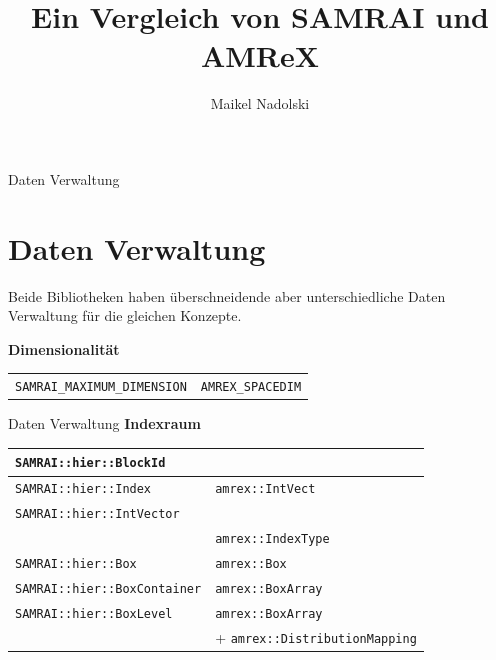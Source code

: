 \documentclass[ucs,9pt]{beamer}
\title[SAMRAI vs. AMReX]{Ein Vergleich von SAMRAI und AMReX}
\author{Maikel Nadolski}
\institute[FU Berlin] %
{Freie Universität Berlin}
\begin{document}
\begin{frame}[plain]
  \titlepage
\end{frame}


\begin{frame}{Daten Verwaltung}
\section {Daten Verwaltung}
Beide Bibliotheken haben überschneidende aber unterschiedliche Daten Verwaltung für die gleichen Konzepte.

\vspace{1cm}
\textbf{Dimensionalität}

\begin{center}
\begin{tabular}{l|l}
\texttt{SAMRAI\_MAXIMUM\_DIMENSION} & \texttt{AMREX\_SPACEDIM}
\end{tabular}
\end{center}
\end{frame}

\begin{frame}{Daten Verwaltung}
\textbf{Indexraum}

\vspace{1cm}
\begin{center}
\begin{tabular}{l|l}
\texttt{SAMRAI::hier::BlockId}      & \\
\hline
\texttt{SAMRAI::hier::Index}        & \texttt{amrex::IntVect}  \\
\hline
\texttt{SAMRAI::hier::IntVector}    & \\
\hline
                                    & \texttt{amrex::IndexType}\\
\hline
\texttt{SAMRAI::hier::Box}          & \texttt{amrex::Box}      \\
\hline
\texttt{SAMRAI::hier::BoxContainer} & \texttt{amrex::BoxArray} \\
\hline
\texttt{SAMRAI::hier::BoxLevel}     & \texttt{amrex::BoxArray} \\
                                    & + \texttt{amrex::DistributionMapping} \\
\end{tabular}
\end{center}
\end{frame}
\end{document}
